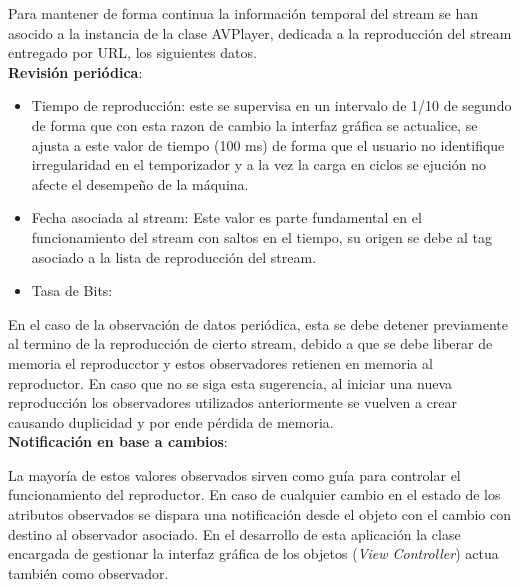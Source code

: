 Para mantener de forma continua la información temporal del stream se han asocido a la instancia de la clase AVPlayer, dedicada a la reproducción del stream entregado por URL, los siguientes datos.\\

\textbf{Revisión periódica}:

\begin{itemize}
\item Tiempo de reproducción: este se supervisa en un intervalo de 1/10 de segundo de forma que con esta razon de cambio la interfaz gráfica se actualice, se ajusta a  este valor de tiempo (100 ms) de forma que el usuario no identifique irregularidad en el temporizador y a la vez la carga en ciclos se ejución no afecte el desempeño de la máquina.
\item Fecha asociada al stream: Este valor es parte fundamental en el funcionamiento del stream con saltos en el tiempo, su origen se debe al tag asociado a la lista de reproducción del stream.
\item Tasa de Bits:
\end{itemize}  

En el caso de la observación de datos periódica, esta se debe detener previamente al termino de la reproducción de cierto stream, debido a que se debe liberar de memoria el reproducctor y estos observadores retienen en memoria al reproductor. En caso que no se siga esta sugerencia, al iniciar una nueva reproducción los observadores utilizados anteriormente se vuelven a crear causando duplicidad y por ende pérdida de memoria.\\


\textbf{Notificación en base a cambios}:

La mayoría de estos valores observados sirven como guía para controlar el funcionamiento del reproductor. En caso de cualquier cambio en el estado de los atributos observados se dispara una notificación desde el objeto con el cambio con destino al observador asociado. 
En el desarrollo de esta aplicación la clase encargada de gestionar la interfaz gráfica de los objetos (\textit{View Controller}) actua también como observador.\\

